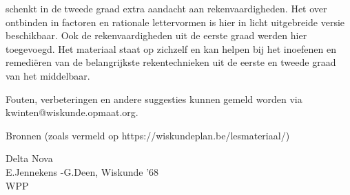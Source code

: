\documentclass{ximera}
\begin{document}
	\author{Wiskundeplan}



 schenkt in de tweede graad extra aandacht aan rekenvaardigheden. Het  over ontbinden in factoren en rationale lettervormen is hier in licht uitgebreide versie beschikbaar. Ook de rekenvaardigheden uit de eerste graad werden hier toegevoegd. Het materiaal staat op zichzelf en kan helpen bij het inoefenen en remediëren van de belangrijkste rekentechnieken uit de eerste en tweede graad van het middelbaar.  


Fouten, verbeteringen en andere suggesties kunnen gemeld worden via kwinten@wiskunde.opmaat.org. 

\vspace{1cm}


Bronnen (zoals vermeld op https://wiskundeplan.be/lesmateriaal/)

Delta Nova\\
E.Jennekens -G.Deen, Wiskunde '68\\
WPP\\
\end{document}
